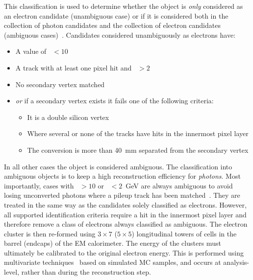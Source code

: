 This classification is used to determine whether the object is \emph{only} considered as an electron candidate (unambiguous case) or if it is considered both in the collection of photon candidates and the collection of electron candidates (ambiguous cases)~\cite{Aaboud:2019ynx}. 
Candidates considered unambiguously as electrons have: %
\begin{itemize}
\item A value of \eoverp\ $<10$
\item A track with at least one pixel hit and \pt\ $>2$~\GeV
\item No secondary vertex matched
\item \emph{or} if a secondary vertex exists it fails one of the following criteria:
\begin{itemize}
\item It is a double silicon vertex
\item Where several or none of the tracks have hits in the innermost pixel layer
\item The conversion is more than 40~mm separated from the secondary vertex
\end{itemize}
\end{itemize}
In all other cases the object is considered ambiguous. 
The classification into ambiguous objects is to keep a high reconstruction efficiency for \emph{photons}.
Most importantly, cases with  \eoverp\ $>10$ or \pt\ $<2$~GeV are always ambiguous to avoid losing unconverted photons where a pileup track has been matched~\cite{Aaboud:2019ynx}.
They are treated in the same way as the candidates solely classified as electrons.
However, all supported identification criteria require a hit in the innermost pixel layer and therefore remove a class of electrons always classified as ambiguous.
The electron cluster is then re-formed using $3 \times 7$ ($5 \times 5$) longitudinal towers of cells in the barrel (endcaps) of the EM calorimeter. 
The energy of the clusters must ultimately be calibrated to the original electron energy.
This is performed using multivariate techniques~\cite{PERF-2013-05} based on simulated MC samples, and occurs at analysis-level, rather than during the reconstruction step.
